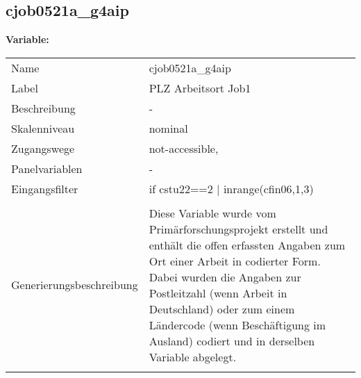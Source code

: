 	
	
	\subsection{cjob0521a\_g4aip}
	\label{subSection:cjob0521a_g4aip}

	\noindent\textbf{Variable:}\\
		\begin{tabular}{lL{11.3cm}}
			\label{tableVariable:cjob0521a_g4aip}
			Name & cjob0521a\_g4aip \\
			Label & PLZ Arbeitsort Job1 \\
			Beschreibung & - \\
			Skalenniveau & nominal \\
			Zugangswege &
				not-accessible,
 \\
			Panelvariablen & -
			 \\
			Eingangsfilter & if cstu22==2 | inrange(cfin06,1,3) \\
 \\
					Generierungsbeschreibung & Diese Variable wurde vom Primärforschungsprojekt erstellt und enthält die offen erfassten Angaben zum Ort einer Arbeit in codierter Form. Dabei wurden die Angaben zur Postleitzahl (wenn Arbeit in Deutschland) oder zum einem Ländercode (wenn Beschäftigung im Ausland) codiert und in derselben Variable abgelegt.
				 \\	
			 \\
		\end{tabular}






	
	\newpage
